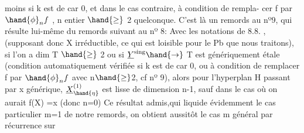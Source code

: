  moins si k est de car 0, et dans le cas contraire, à condition de rempla-%
cer f par $\hand{\phi}_{n}f$ , n entier $\hand{\geq}$ 2 quelconque.  C'est là  un remords au nº9,
qui résulte lui-même du remords suivant au nº 8:  Avec les notations de
8.8. , (supposant donc X irréductible, ce qui est loisible pour le Pb
que nous traitons), si  l'on a dim T $\hand{\geq}$ 2  ou si  $\underline{Y}^{\text{sing}}\hand{\rightarrow}$ T  est
génériquement étale (condition automatiquement vérifiée si k est de car 0,
ou à condition de remplacer f par $\hand{\phi}_{n}f$ avec n$\hand{\geq}$2, cf nº 9), alors pour
l'hyperplan  H\hand{$_{\eta}$} passant par x  générique,  $\underline{X}^{(1)}_{\hand{\eta}}$ est lisse
de dimension n-1,  sauf dans le cas  où  on aurait  f(X) =\hand{$\{$}x\hand{$\}$}  (donc n=0)
Ce résultat admis,\hand{(}qui liquide évidemment le cas particulier m=1 de
notre remords, on obtient aussitôt le cas  m général  par récurrence sur

